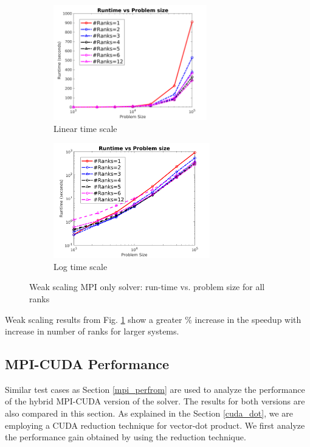 \documentclass[sigplan,screen]{acmart}
\begin{document}
\begin{figure}
	\begin{subfigure}{0.3\textwidth}
		\includegraphics[trim= 10 5 35 10,clip, width=0.95\linewidth, height=5cm]{plots/MPI_weak_allrank.png} 
		\caption{Linear time scale}
	\end{subfigure}
	\begin{subfigure}{0.3\textwidth}
		\includegraphics[trim= 10 5 35 10,clip, width=0.95\linewidth, height=5cm]{plots/MPI_weak_allrank_loglog.png}
		\caption{Log time scale}
	\end{subfigure}
	\caption{Weak scaling MPI only solver: run-time vs. problem size for all ranks}
	\label{weak}
\end{figure}

Weak scaling results from Fig. \ref{weak} show a greater \% increase in the speedup with increase in number of ranks for larger systems. 

\subsection{MPI-CUDA Performance}
Similar test cases as Section \ref{mpi_perfrom} are used to analyze the performance of the hybrid MPI-CUDA version of the solver. The results for both versions are also compared in this section. As explained in the Section \ref{cuda_dot}, we are employing a CUDA reduction technique for vector-dot product. We first analyze the performance gain obtained by using the reduction technique. 
\end{document}
